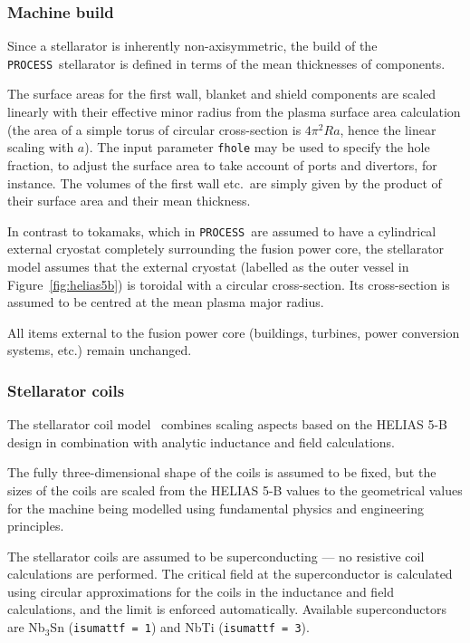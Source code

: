 \documentclass[11pt,a4paper]{report}
\newcommand{\process}{\mbox{\texttt{PROCESS}}}
\begin{document}
\subsubsection{Machine build}
\label{sec:stbuild}

Since a stellarator is inherently non-axisymmetric, the build of the \process\
stellarator is defined in terms of the mean thicknesses of components.

The surface areas for the first wall, blanket and shield components are scaled
linearly with their effective minor radius from the plasma surface area
calculation (the area of a simple torus of circular cross-section is $4 \pi^2
R a$, hence the linear scaling with $a$). The input parameter \texttt{fhole}
may be used to specify the hole fraction, to adjust the surface area to
take account of ports and divertors, for instance. The volumes of the first
wall etc.\ are simply given by the product of their surface area and their
mean thickness.

In contrast to tokamaks, which in \process\ are assumed to have a cylindrical
external cryostat completely surrounding the fusion power core, the
stellarator model assumes that the external cryostat (labelled as the outer
vessel in Figure~\ref{fig:helias5b}) is toroidal with a circular
cross-section. Its cross-section is assumed to be centred at the mean plasma
major radius.

All items external to the fusion power core (buildings, turbines, power
conversion systems, etc.) remain unchanged.

\subsubsection{Stellarator coils}

The stellarator coil model~\cite{stell_coil, stell_coil2} combines scaling
aspects based on the HELIAS 5-B design in combination with analytic inductance
and field calculations.

The fully three-dimensional shape of the coils is assumed to be fixed, but the
sizes of the coils are scaled from the HELIAS 5-B values to the geometrical
values for the machine being modelled using fundamental physics and
engineering principles.

The stellarator coils are assumed to be superconducting --- no resistive coil
calculations are performed.  The critical field at the superconductor is
calculated using circular approximations for the coils in the inductance and
field calculations, and the limit is enforced automatically. Available
superconductors are Nb$_3$Sn (\texttt{isumattf = 1}) and NbTi
(\texttt{isumattf = 3}).
\end{document}
